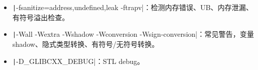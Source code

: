 \begin{itemize}
\item \texttt|-fsanitize=address,undefined,leak -ftrapv|：检测内存错误、UB、内存泄漏、有符号溢出检查。
\item \texttt|-Wall -Wextra -Wshadow -Wconversion -Wsign-conversion|：常见警告，变量 shadow、隐式类型转换、有符号/无符号转换。
\item \texttt|-D_GLIBCXX_DEBUG|：STL debug。
\end{itemize}
